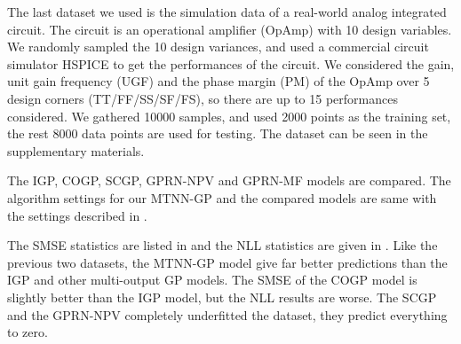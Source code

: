 The last dataset we used is the simulation data of a real-world analog integrated circuit. The circuit is an operational amplifier (OpAmp) with 10 design variables. We randomly sampled the 10 design variances, and used a commercial circuit simulator HSPICE to get the performances of the circuit. We considered the gain, unit gain frequency (UGF) and the phase margin (PM) of the OpAmp over 5 design corners (TT/FF/SS/SF/FS), so there are up to 15 performances considered. We gathered 10000 samples, and used 2000 points as the training set, the rest 8000 data points are used for testing. The dataset can be seen in the supplementary materials.


The IGP, COGP, SCGP, GPRN-NPV and GPRN-MF models are compared. The algorithm settings for our MTNN-GP and the compared models are same with the settings described in .


The SMSE statistics are listed in  and the NLL statistics are given in . Like the previous two datasets, the MTNN-GP model give far better predictions than the IGP and other multi-output GP models. The SMSE of the COGP model is slightly better than the IGP model, but the NLL results are worse. The SCGP and the GPRN-NPV completely underfitted the dataset, they predict everything to zero.

